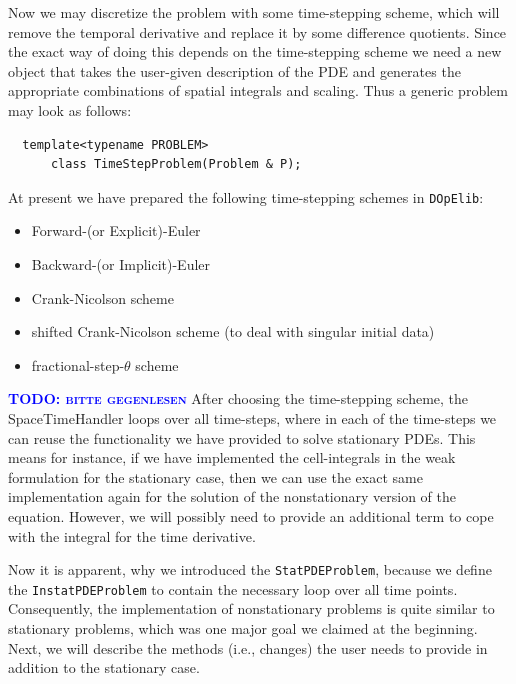 \documentclass[smallextended]{svjour3}       %
\numberwithin{equation}{section}
\newcommand{\dope}{\texttt{DOpElib}}
\newcommand{\todo}[1]{\textbf{\textsc{\textcolor{blue}{TODO: #1}}}}
\begin{document}
Now we may discretize the problem with some time-stepping scheme, which will 
remove the temporal derivative and replace it by some difference quotients. 
Since the exact way of doing this depends on the time-stepping scheme 
we need a new object that takes the user-given description of the PDE and 
generates the appropriate combinations of spatial integrals and scaling.
Thus a generic problem may look as follows:
\begin{lstlisting}
  template<typename PROBLEM>
      class TimeStepProblem(Problem & P);
\end{lstlisting}
At present we have prepared the following time-stepping schemes in \dope:
\begin{itemize}
\item Forward-(or Explicit)-Euler
\item Backward-(or Implicit)-Euler
\item Crank-Nicolson scheme
\item shifted Crank-Nicolson scheme (to deal with singular initial data)
\item fractional-step-$\theta$ scheme
\end{itemize}
\todo{bitte gegenlesen}
After choosing the time-stepping scheme, the SpaceTimeHandler  
loops over all time-steps, where in each of the 
time-steps we can reuse the functionality we have provided to solve 
stationary PDEs. 
This means for instance, if we have implemented the 
cell-integrals in the weak formulation for the stationary case, 
then we can use the exact same 
implementation again for the solution of the nonstationary version of 
the equation. However, we will possibly need to provide an additional 
term to cope with the integral for the time derivative.

Now it is apparent, why we introduced the \texttt{StatPDEProblem}, because
we define the \texttt{InstatPDEProblem} to contain the necessary 
loop over all time points. Consequently, the implementation 
of nonstationary problems is quite similar to stationary problems,
which was one major goal we claimed at the beginning.
Next, we will describe the methods (i.e., changes) the user needs to 
provide in addition to the stationary case.
\end{document}
